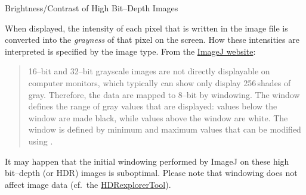 \begin{infobox}
\caption{\label{infobox:Displaying-HDRI}Brightness/Contrast of High Bit--Depth
Images}


\noindent When displayed, the intensity of each pixel that is written
in the image file is converted into the \emph{grayness} of that pixel
on the screen. How these intensities are interpreted is specified
by the image type. From the \href{http://imagej.nih.gov/ij/docs/concepts.html}{ImageJ website}:
\begin{quote}
16--bit and 32--bit grayscale images are not directly displayable
on computer monitors, which typically can show only display 256\,shades
of gray. Therefore, the data are mapped to 8--bit by windowing. The
window defines the range of gray values that are displayed: values
below the window are made black, while values above the window are
white. The window is defined by minimum and maximum values that can
be modified using .
\end{quote}
It may happen that the initial windowing performed by ImageJ on these
high bit--depth (or HDR) images
is suboptimal. Please note that windowing does not affect image data
(cf.\ the \href{http://imagej.nih.gov/ij/macros/tools/HDRexplorerTool.txt}{HDRexplorerTool}).
\end{infobox}



\subsubsection[{\protect\userinterface{Threshold\ldots{}\ {[}T{]}}}]{\protect{}\label{sub:Threshold...[T]}\improvement{}}

